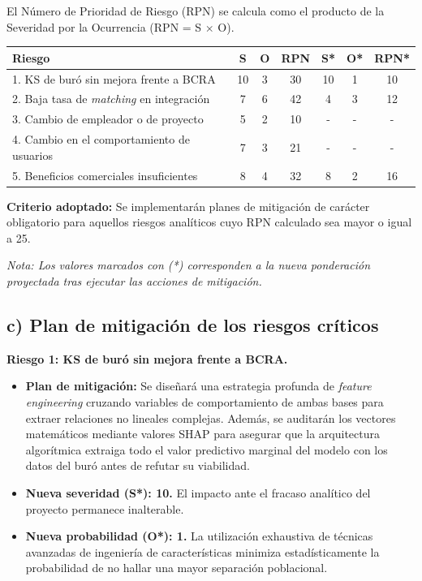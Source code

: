 \documentclass[
11pt, %
]{charter}
\begin{document}
El Número de Prioridad de Riesgo (RPN) se calcula como el producto de la Severidad por la Ocurrencia (RPN = S $\times$ O).

\begin{table}[htpb]
\centering
\begin{tabularx}{\linewidth}{@{}|X|c|c|c|c|c|c|@{}}
\hline
\rowcolor[HTML]{C0C0C0} 
\textbf{Riesgo} & \textbf{S} & \textbf{O} & \textbf{RPN} & \textbf{S*} & \textbf{O*} & \textbf{RPN*} \\ \hline
1. KS de buró sin mejora frente a BCRA & 10 & 3 & 30 & 10 & 1 & 10 \\ \hline
2. Baja tasa de \textit{matching} en integración & 7 & 6 & 42 & 4 & 3 & 12 \\ \hline
3. Cambio de empleador o de proyecto & 5 & 2 & 10 & - & - & - \\ \hline
4. Cambio en el comportamiento de usuarios & 7 & 3 & 21 & - & - & - \\ \hline
5. Beneficios comerciales insuficientes & 8 & 4 & 32 & 8 & 2 & 16 \\ \hline
\end{tabularx}%
\end{table}

\textbf{Criterio adoptado:} Se implementarán planes de mitigación de carácter obligatorio para aquellos riesgos analíticos cuyo RPN calculado sea mayor o igual a 25. 

\textit{Nota: Los valores marcados con (*) corresponden a la nueva ponderación proyectada tras ejecutar las acciones de mitigación.}

\subsection*{c) Plan de mitigación de los riesgos críticos}

\textbf{Riesgo 1: KS de buró sin mejora frente a BCRA.}
\begin{itemize}
    \item \textbf{Plan de mitigación:} Se diseñará una estrategia profunda de \textit{feature engineering} cruzando variables de comportamiento de ambas bases para extraer relaciones no lineales complejas. Además, se auditarán los vectores matemáticos mediante valores SHAP para asegurar que la arquitectura algorítmica extraiga todo el valor predictivo marginal del modelo con los datos del buró antes de refutar su viabilidad.
    \item \textbf{Nueva severidad (S*): 10.} El impacto ante el fracaso analítico del proyecto permanece inalterable.
    \item \textbf{Nueva probabilidad (O*): 1.} La utilización exhaustiva de técnicas avanzadas de ingeniería de características minimiza estadísticamente la probabilidad de no hallar una mayor separación poblacional.
\end{itemize}
\end{document}
